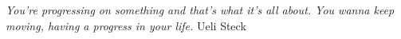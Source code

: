 \thispagestyle{empty}
\vspace*{\fill}
\emph{
    You're progressing on something and that's what it's all about. You wanna keep moving, having a progress in your life.
}
\hfill Ueli Steck


